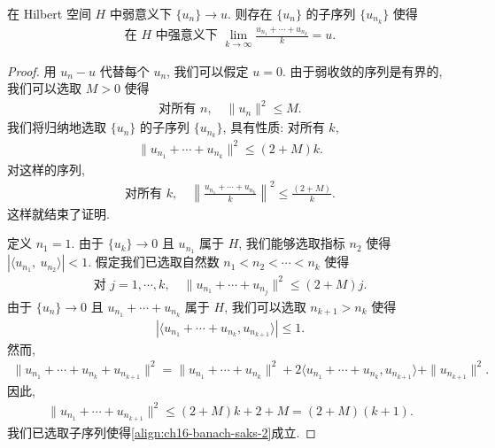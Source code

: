 \documentclass[../../main.tex]{subfiles}
\begin{document}
\begin{theorem}\label{theorem:ch16-banach-saks}
在 Hilbert 空间 $H$ 中弱意义下 $\{u_{n}\}\to u$. 则存在 $\{u_{n}\}$ 的子序列 $\{u_{n_{k}}\}$ 使得
\begin{align}
\text{在 }H\text{ 中强意义下 }\lim_{k\to\infty}\frac{u_{n_{1}}+\cdots+u_{n_{k}}}{k}=u.\label{align:ch16-banach-saks-1}
\end{align}
\end{theorem}

\begin{proof}
用 $u_{n}-u$ 代替每个 $u_{n}$, 我们可以假定 $u=0$. 由于弱收敛的序列是有界的, 我们可以选取 $M>0$ 使得
\begin{align*}
\text{对所有 }n,\quad\|u_{n}\|^{2}\leqslant M.
\end{align*}
我们将归纳地选取 $\{u_{n}\}$ 的子序列 $\{u_{n_{k}}\}$, 具有性质: 对所有 $k$,
\begin{align}
\|u_{n_{1}}+\cdots+u_{n_{k}}\|^{2}\leqslant(2+M)k.\label{align:ch16-banach-saks-2}
\end{align}
对这样的序列,
\begin{align}
\text{对所有 }k,\quad\left\|\frac{u_{n_{1}}+\cdots+u_{n_{k}}}{k}\right\|^{2}\leqslant\frac{(2+M)}{k}.\label{align:ch16-banach-saks-3}
\end{align}
这样就结束了证明.

定义 $n_{1}=1$. 由于 $\{u_{k}\}\to 0$ 且 $u_{n_{1}}$ 属于 $H$, 我们能够选取指标 $n_{2}$ 使得 $|\langle u_{n_{1}},\ u_{n_{2}}\rangle|<1$. 假定我们已选取自然数 $n_{1}<n_{2}<\cdots<n_{k}$ 使得
\begin{align*}
\text{对 }j=1,\cdots,k,\quad\|u_{n_{1}}+\cdots+u_{n_{j}}\|^{2}\leqslant(2+M)j.
\end{align*}
由于 $\{u_{n}\}\to 0$ 且 $u_{n_{1}}+\cdots+u_{n_{k}}$ 属于 $H$, 我们可以选取 $n_{k+1}>n_{k}$ 使得
\begin{align*}
|\langle u_{n_{1}}+\cdots+u_{n_{k}},u_{n_{k+1}}\rangle|\leqslant 1.
\end{align*}
然而,
\begin{align*}
\|u_{n_{1}}+\cdots+u_{n_{k}}+u_{n_{k+1}}\|^{2}=\|u_{n_{1}}+\cdots+u_{n_{k}}\|^{2}+2\langle u_{n_{1}}+\cdots+u_{n_{k}},u_{n_{k+1}}\rangle+\|u_{n_{k+1}}\|^{2}.
\end{align*}
因此,
\begin{align*}
\|u_{n_{1}}+\cdots+u_{n_{k+1}}\|^{2}\leqslant(2+M)k+2+M=(2+M)(k+1).
\end{align*}
我们已选取子序列使得\eqref{align:ch16-banach-saks-2}成立.
\end{proof}
\end{document}
